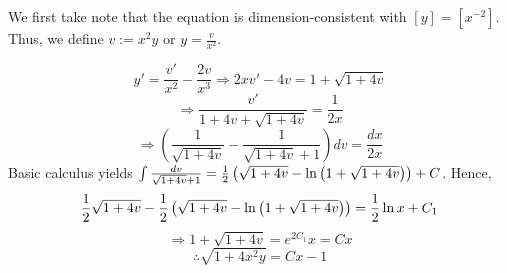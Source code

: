 \item

We first take note that the equation is dimension-consistent with $[y] = [x^{-2}]$.
Thus, we define $v := x^2 y$ or $y = \frac{v}{x^2}$.

\[
	y' = \frac{v'}{x^2} - \frac{2v}{x^3}
	\Rightarrow 2xv' - 4v = 1 + \sqrt{1 + 4v}
\]
\[
	\Rightarrow \frac{v'}{1 + 4v + \sqrt{1 + 4v}} = \frac{1}{2x}
\]
\[
	\Rightarrow \left( \frac{1}{\sqrt{1 + 4v}} - \frac{1}{\sqrt{1 + 4v} + 1} \right) dv = \frac{dx}{2x}
\]
Basic calculus yields $\int \frac{dv}{\sqrt{1 + 4v} + 1} = \frac{1}{2} \left( \sqrt{1 + 4v} - \ln \left( 1 + \sqrt{1 + 4v}\right) \right) + C$.
Hence,
\[
	\frac{1}{2} \sqrt{1 + 4v} - \frac{1}{2} \left( \sqrt{1 + 4v} - \ln \left( 1 + \sqrt{1 + 4v}\right) \right) = \frac{1}{2} \ln x + C_1
\]
\[
	\Rightarrow 1 + \sqrt{1 + 4v} = e^{2C_1} x = Cx
\]
\[
	\therefore \sqrt{1 + 4x^2 y} = Cx - 1
\]